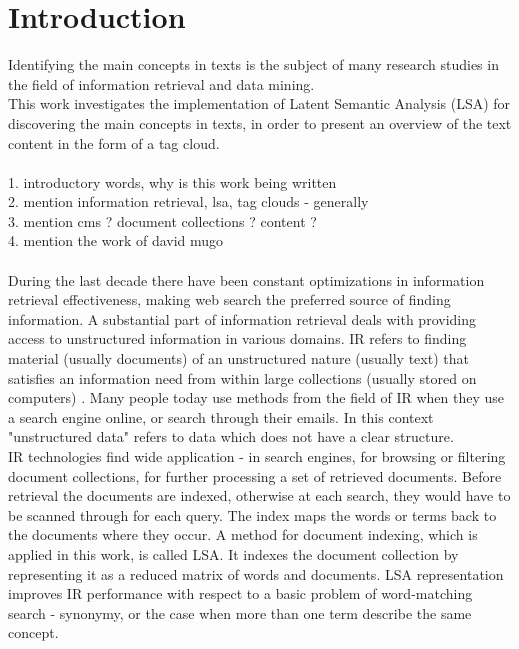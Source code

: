 \chapter{Introduction}
\label{sec:introduction}

Identifying the main concepts in texts is the subject of many research studies in the field of information retrieval and data mining. \\

This work investigates the implementation of Latent Semantic Analysis (LSA) for discovering the main concepts in texts, in order to present an overview of the text content in the form of a tag cloud.\\
\\
1. introductory words, why is this work being written \\
2. mention information retrieval, lsa, tag clouds - generally\\
3. mention cms ? document collections ? content ? \\
4. mention the work of david mugo \\
\\
During the last decade there have been constant optimizations in information retrieval effectiveness, making web search the preferred source of finding information. A substantial part of information retrieval deals with providing access to unstructured information in various domains. \gls{IR} refers to finding material (usually documents) of an unstructured nature (usually text) that satisfies an information need from within large collections (usually stored on computers) \cite{Mann08}. Many people today use methods from the field of IR when they use a search engine online, or search through their emails. In this context "unstructured data" refers to data which does not have a clear structure.\\

\gls{IR} technologies find wide application - in search engines, for browsing or filtering document collections, for further processing a set of retrieved documents. Before retrieval the documents are indexed, otherwise at each search, they would have to be scanned through for each query. The index maps the words or terms back to the documents where they occur. A method for document indexing, which is applied in this work, is called \gls{LSA}. It indexes the document collection by representing it as a reduced matrix of words and documents. \gls{LSA} representation improves \gls{IR} performance with respect to a basic problem of word-matching search - synonymy, or the case when more than one term describe the same concept. \\

